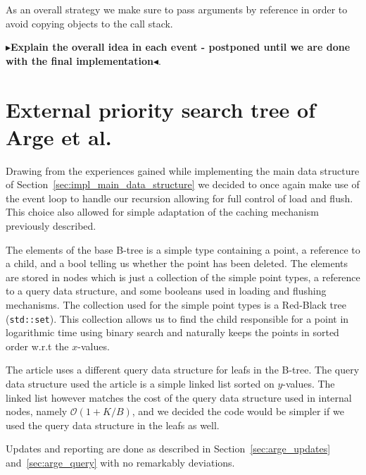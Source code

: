 \documentclass[twoside,11pt,openright]{report}
\newcommand{\todo}[1]{{\color[rgb]{.5,0,0}\textbf{$\blacktriangleright$#1$\blacktriangleleft$}}}
\begin{document}
As an overall strategy we make sure to pass arguments by reference in order to avoid copying objects to the call stack.

\todo{Explain the overall idea in each event - postponed until we are done with the final implementation}.

\section{External priority search tree of Arge et al.}
Drawing from the experiences gained while implementing the main data structure of Section~\ref{sec:impl_main_data_structure} we decided to once again make use of the event loop to handle our recursion allowing for full control of load and flush. This choice also allowed for simple adaptation of the caching mechanism previously described.

The elements of the base B-tree is a simple type containing a point, a reference to a child, and a bool telling us whether the point has been deleted. The elements are stored in nodes which is just a collection of the simple point types, a reference to a query data structure, and some booleans used in loading and flushing mechanisms. The collection used for the simple point types is a Red-Black tree (\texttt{std::set}). This collection allows us to find the child responsible for a point in logarithmic time using binary search and naturally keeps the points in sorted order w.r.t the $x$-values.

The article uses a different query data structure for leafs in the B-tree. The query data structure used the article is a simple linked list sorted on $y$-values. The linked list however matches the cost of the query data structure used in internal nodes, namely $\mathcal{O}(1 + K/B)$, and we decided the code would be simpler if we used the query data structure in the leafs as well.

Updates and reporting are done as described in Section~\ref{sec:arge_updates} and~\ref{sec:arge_query} with no remarkably deviations.

\clearpage
{}

\end{document}

